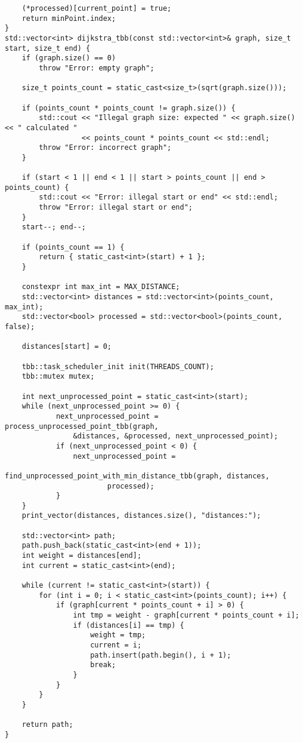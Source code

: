 \documentclass{report}
\begin{document}
\begin{lstlisting}
    (*processed)[current_point] = true;
    return minPoint.index;
}
std::vector<int> dijkstra_tbb(const std::vector<int>& graph, size_t start, size_t end) {
    if (graph.size() == 0)
        throw "Error: empty graph";

    size_t points_count = static_cast<size_t>(sqrt(graph.size()));

    if (points_count * points_count != graph.size()) {
        std::cout << "Illegal graph size: expected " << graph.size() << " calculated "
                  << points_count * points_count << std::endl;
        throw "Error: incorrect graph";
    }

    if (start < 1 || end < 1 || start > points_count || end > points_count) {
        std::cout << "Error: illegal start or end" << std::endl;
        throw "Error: illegal start or end";
    }
    start--; end--;

    if (points_count == 1) {
        return { static_cast<int>(start) + 1 };
    }

    constexpr int max_int = MAX_DISTANCE;
    std::vector<int> distances = std::vector<int>(points_count, max_int);
    std::vector<bool> processed = std::vector<bool>(points_count, false);

    distances[start] = 0;

    tbb::task_scheduler_init init(THREADS_COUNT);
    tbb::mutex mutex;

    int next_unprocessed_point = static_cast<int>(start);
    while (next_unprocessed_point >= 0) {
            next_unprocessed_point = process_unprocessed_point_tbb(graph,
                &distances, &processed, next_unprocessed_point);
            if (next_unprocessed_point < 0) {
                next_unprocessed_point =
                    find_unprocessed_point_with_min_distance_tbb(graph, distances,
                        processed);
            }
    }
    print_vector(distances, distances.size(), "distances:");

    std::vector<int> path;
    path.push_back(static_cast<int>(end + 1));
    int weight = distances[end];
    int current = static_cast<int>(end);

    while (current != static_cast<int>(start)) {
        for (int i = 0; i < static_cast<int>(points_count); i++) {
            if (graph[current * points_count + i] > 0) {
                int tmp = weight - graph[current * points_count + i];
                if (distances[i] == tmp) {
                    weight = tmp;
                    current = i;
                    path.insert(path.begin(), i + 1);
                    break;
                }
            }
        }
    }

    return path;
}
\end{lstlisting}
\end{document}
